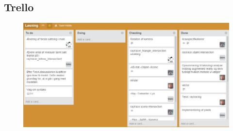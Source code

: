 \documentclass[oneside,a4paper,titlepage]{article}
\begin{document}
\subsection{Trello}
\label{sec:trello}

\begin{figure}[H]
   \centering
   \includegraphics[width=15cm]{./../graphics/trello}
\end{figure}
\end{document}
